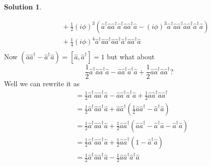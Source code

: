 \documentclass[10pt]{article}
\theoremstyle{definition}
\newtheorem{soln}{Solution}
\begin{document}
\begin{soln}
\begin{enumerate}[label=(\alph*)]
\begin{align*}
                                                  & \quad +\frac{1}{2}(i\phi)^3\left(
            \hat{a}^\dagger\hat{a}\hat{a}^\dagger\hat{a}^\dagger\hat{a}\hat{a}^\dagger\hat{a}
            -(i\phi)^3\hat{a}^\dagger\hat{a}\hat{a}^\dagger\hat{a}\hat{a}^\dagger\hat{a}^\dagger\hat{a}
            \right)                                                                                                                                                                                                                                                                                                      \\
                                                  & \quad +\frac{1}{4}(i\phi)^4\hat{a}^\dagger\hat{a}\hat{a}^\dagger\hat{a}\hat{a}^\dagger\hat{a}^\dagger\hat{a}\hat{a}^\dagger\hat{a}                                                                                                                                   \\
          \end{align*}
          Now $(\hat{a}\hat{a}^\dagger-\hat{a}^\dagger\hat{a})=\left[\hat{a},\hat{a}^\dagger\right]=1$ but what about
          $$\frac{1}{2}\hat{a}^\dagger\hat{a}\hat{a}^\dagger\hat{a}
            -\hat{a}\hat{a}^\dagger\hat{a}^\dagger\hat{a}
            +\frac{1}{2}\hat{a}\hat{a}^\dagger\hat{a}\hat{a}^\dagger
            ?$$
          Well we can rewrite it as
          \begin{align*}
             & =\frac{1}{2}\hat{a}^\dagger\hat{a}\hat{a}^\dagger\hat{a}
            -\hat{a}\hat{a}^\dagger\hat{a}^\dagger\hat{a}
            +\frac{1}{2}\hat{a}\hat{a}^\dagger\hat{a}\hat{a}^\dagger                                                            \\
             & =\frac{1}{2}\hat{a}^\dagger\hat{a}\hat{a}^\dagger\hat{a}
            +\hat{a}\hat{a}^\dagger\left(\frac{1}{2}\hat{a}\hat{a}^\dagger-\hat{a}^\dagger\hat{a}\right)                        \\
             & =\frac{1}{2}\hat{a}^\dagger\hat{a}\hat{a}^\dagger\hat{a}
            +\frac{1}{2}\hat{a}\hat{a}^\dagger\left(\hat{a}\hat{a}^\dagger-\hat{a}^\dagger\hat{a}-\hat{a}^\dagger\hat{a}\right) \\
             & =\frac{1}{2}\hat{a}^\dagger\hat{a}\hat{a}^\dagger\hat{a}
            +\frac{1}{2}\hat{a}\hat{a}^\dagger\left(1-\hat{a}^\dagger\hat{a}\right)                                             \\
             & =\frac{1}{2}\hat{a}^\dagger\hat{a}\hat{a}^\dagger\hat{a}-\frac{1}{2}\hat{a}\hat{a}^\dagger\hat{a}^\dagger\hat{a}

\end{align*}
\end{enumerate}
\end{soln}
\end{document}
